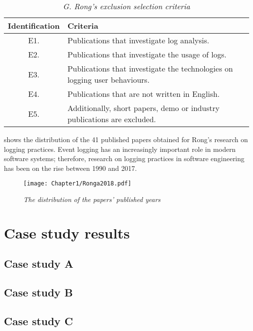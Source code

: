 \begin{table}[!htb]
	\centering
	\caption[G. Rong's exclusion selection criteria]
	{\textit{G. Rong's exclusion selection criteria \cite{Rong2018a}}}
	\label{tbl:CH1_RongExlSelectionCriteria}
	\begin{tabularx}{\textwidth}{|c|X|}
		\hline \textbf{Identification} & \textbf{Criteria} \\
		\hline E1. & Publications that investigate log analysis. \\
		\hline E2. & Publications that investigate the usage of logs. \\
		\hline E3. & Publications that investigate the technologies on logging user behaviours. \\
		\hline E4. & Publications that are not written in English. \\
		\hline E5. & Additionally, short papers, demo or industry publications are excluded. \\
		\hline
	\end{tabularx}
\end{table}

\clearpage

 shows the distribution of the 41 published papers obtained for Rong's research on logging practices. Event logging has an increasingly important role in modern software systems; therefore, research on logging practices in software engineering has been on the rise between 1990 and 2017.

\begin{figure}[!htb] %
	\centering %
	\texttt{[image: Chapter1/Ronga2018.pdf]}
	\caption[The distribution of the papers’ published years]
	{\textit{The distribution of the papers’ published years \cite{Rong2018a}}} \label{fig:PushblisedPapers}
\end{figure} 

\chapter{Case study results}\label{apx:caseStudies}
\section{Case study A}



\clearpage

\section{Case study B}



\section{Case study C}




